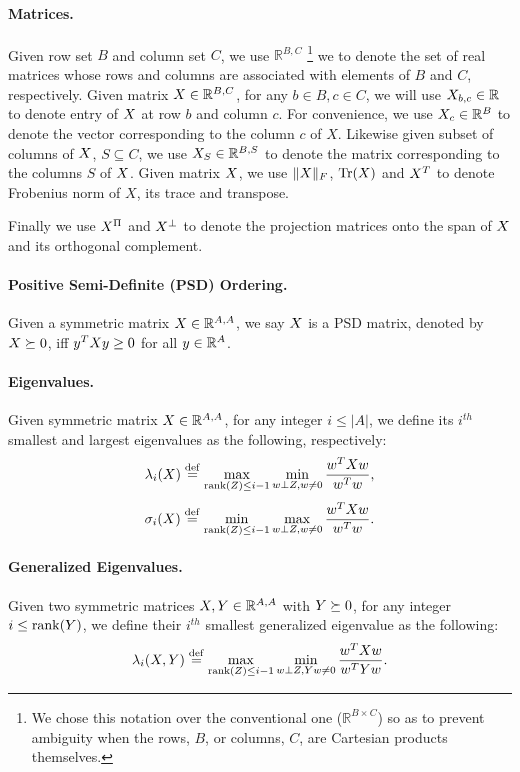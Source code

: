 \documentclass{article}
\def\triangleq{\overset{\mathrm{def}}{=}}
\newcommand{\R}{\mathbb{R}}
\let\proj=\Pi
\DeclareMathOperator{\tr}{Tr}
\DeclareMathOperator{\rank}{rank}
\def\vec{}
\newcommand{\wvec}{\vec{w}}
\begin{document}
\paragraph{Matrices.} Given row set $B$ and column set $C$, we use $\R^{B,C}$ \footnote{We chose
  this notation over the conventional one ($\R^{B\times C}$) so as to
  prevent ambiguity when the rows, $B$, or columns, $C$, are Cartesian
  products themselves.}  we to denote the set of real matrices whose
rows and columns are associated with elements of $B$ and $C$,
respectively.  Given matrix $\xmat\in \R^{B, C}$, for any $b\in B,
c\in C$, we will use $\xmat_{b,c}\in \R$ to denote entry of $\xmat$ at
row $b$ and column $c$. For convenience, we use $\xmat_c\in \R^{B}$ to
denote the vector corresponding to the column $c$ of $X$. Likewise
given subset of columns of $\xmat$, $S\subseteq C$, we use $\xmat_S\in
\R^{B, S}$ to denote the matrix corresponding to the columns $S$ of
$\xmat$.  Given matrix $\xmat$, we use $\|\xmat\|_F$, $\tr(\xmat)$ and
$\xmat^T$ to denote Frobenius norm of $X$, its trace and transpose.

Finally we use $\xmat^{\proj}$ and $\xmat^{\perp}$ to denote the
projection matrices onto the span of $\xmat$ and its orthogonal
complement.

\paragraph{Positive Semi-Definite (PSD) Ordering.} Given a symmetric
matrix $\xmat \in \R^{A,A}$, we say $\xmat$ is a PSD matrix, denoted
by $\xmat \succeq 0$, iff $\yvec^T \xmat \yvec \ge 0$ for all $\yvec
\in \R^{A}$.

\paragraph{Eigenvalues.} Given symmetric matrix $\xmat\in \R^{A,A}$,
for any integer $i \le |A|$, we define its $i^{th}$ smallest and
largest eigenvalues as the following, respectively:
\[
\lambda_i(X) \triangleq \max_{\rank(\zmat) \le i-1} \min_{\wvec\perp \zmat, 
\wvec \neq 0}
\frac{ \wvec^T \xmat \wvec }{\wvec^T \wvec},\]\quad\quad 
\[\sigma_i(X) \triangleq \min_{\rank(\zmat) \le i-1} \max_{\wvec\perp \zmat, 
\wvec \neq 0}
\frac{ \wvec^T \xmat \wvec }{\wvec^T \wvec}.
\]
\paragraph{Generalized Eigenvalues.} Given two symmetric matrices
$\xmat, \ymat \in \R^{A,A}$ with $\ymat\succeq 0$, for any integer $i
\le \rank(\ymat)$, we define their $i^{th}$ smallest generalized
eigenvalue as the following:
\begin{equation} \label{eq:60210312}
\lambda_i(X,Y) \triangleq \max_{\rank(\zmat) \le i-1} \min_{\wvec\perp \zmat, 
\ymat \wvec \neq 0}
\frac{ \wvec^T \xmat  \wvec }{\wvec^T \ymat \wvec}. 
\end{equation} 
\end{document}
